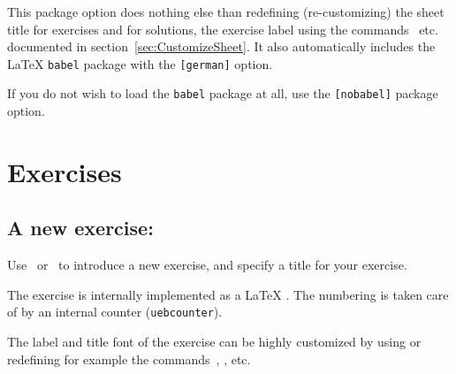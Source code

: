 \documentclass[11pt,a4paper]{article}
\begin{document}
\begin{pkgtip}
  This package option does nothing else than redefining (re-customizing) the sheet title
  for exercises and for solutions, the exercise label using the
  commands~ etc. documented in
  section~\ref{sec:CustomizeSheet}. It also automatically includes the \LaTeX{}
  \texttt{babel} package with the \texttt{[german]} option.
\end{pkgtip}


\begin{pkgtip}
  If you do not wish to load the \texttt{babel} package at all, use the \texttt{[nobabel]}
  package option.
\end{pkgtip}




\section{Exercises}

\subsection{A new exercise: }

Use~ or~ to introduce a new exercise, and specify a
title for your exercise.


The exercise is internally implemented as a \LaTeX{} . The numbering is
taken care of by an internal counter (\texttt{uebcounter}).

The label and title font of the exercise can be highly customized by using or redefining
for example the commands~, ,
 etc.

\end{document}
